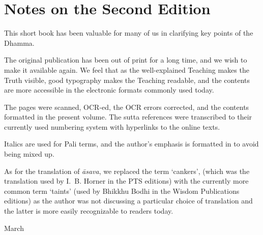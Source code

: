 \chapter{Notes on the Second Edition}

This short book has been valuable for many of us in clarifying key points of the Dhamma.

The original publication has been out of print for a long time, and we wish to make it available again.
We feel that as the well-explained Teaching makes the Truth visible, good typography makes the Teaching readable,
and the contents are more accessible in the electronic formats commonly used today.

The pages were scanned, OCR-ed, the OCR errors corrected, and the contents formatted in the present volume.
The sutta references were transcribed to their currently used numbering system with hyperlinks to the online texts.

Italics are used for Pali terms, and the author's emphasis is formatted in  to avoid being mixed up.

As for the translation of \emph{āsava}, we replaced the term `cankers',
(which was the translation used by I.~B. Horner in the PTS editions)
with the currently more common term `taints'
(used by Bhikkhu Bodhi in the Wisdom Publications editions)
as the author was not discussing a particular choice of translation
and the latter is more easily recognizable to readers today.

\bigskip

{ March
\par}
